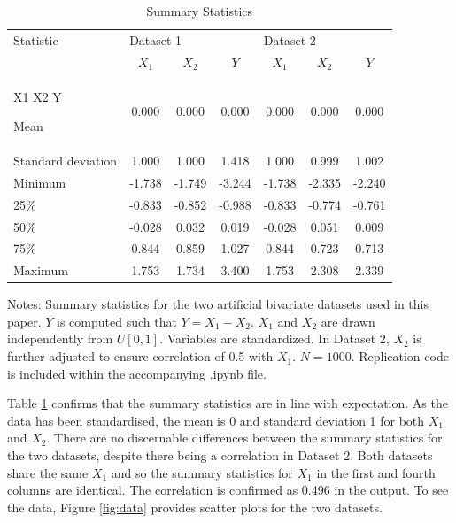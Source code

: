 \documentclass{article}
\begin{document}
\begin{table}
	\begin{center}
		\caption{Summary Statistics}
		\label{tab:data1}
		\begin{tabular}{l c c c c c c}
			\hline
			Statistic & \multicolumn{3}{l}{Dataset 1} & \multicolumn{3}{l}{Dataset 2}\\
			& $X_1$ & $X_2$ & $Y$ & $X_1$ & $X_2$& $Y$\\
			\hline
			X1	X2	Y
			
			Mean &	0.000 & 0.000 & 0.000 &	0.000 & 0.000 & 0.000 \\
			Standard deviation & 1.000 & 1.000 &	1.418 & 1.000 & 0.999 & 1.002 \\
			Minimum &	-1.738 & -1.749 &	-3.244 & -1.738 & -2.335 & -2.240 \\
			25\%&	-0.833 &	-0.852 & -0.988 & -0.833 & -0.774 & -0.761 \\
			50\% &	-0.028&	0.032 &	0.019& -0.028 & 0.051 & 0.009 \\
			75\% &	0.844&	0.859&	1.027 & 0.844 & 0.723 & 0.713 \\
			Maximum &	1.753 &	1.734 & 	3.400 & 1.753 & 2.308 & 2.339\\
			\hline
		\end{tabular}
	\end{center}
	\raggedright
	\footnotesize{Notes: Summary statistics for the two artificial bivariate datasets used in this paper. $Y$ is computed such that $Y = X_1 - X_2$. $X_1$ and $X_2$ are drawn independently from $U[0,1]$. Variables are standardized. In Dataset 2, $X_2$ is further adjusted to ensure correlation of 0.5 with $X_1$. $N=1000$. Replication code is included within the accompanying .ipynb file.}
\end{table}

Table \ref{tab:data1} confirms that the summary statistics are in line with expectation. As the data has been standardised, the mean is 0 and standard deviation 1 for both $X_1$ and $X_2$. There are no discernable differences between the summary statistics for the two datasets, despite there being a correlation in Dataset 2. Both datasets share the same $X_1$ and so the summary statistics for $X_1$ in the first and fourth columns are identical. The correlation is confirmed as 0.496 in the output. To see the data, Figure \ref{fig:data} provides scatter plots for the two datasets.
\end{document}
